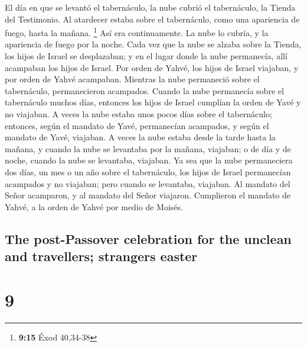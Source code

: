 \begin{paracol}{2}
 El día en que se levantó el tabernáculo, la nube cubrió
el tabernáculo, la Tienda del Testimonio. Al atardecer estaba sobre el
tabernáculo, como una apariencia de fuego, hasta la mañana. \footnote{\textbf{9:15}
  Éxod 40,34-38}  Así era continuamente. La nube lo
cubría, y la apariencia de fuego por la noche.  Cada vez
que la nube se alzaba sobre la Tienda, los hijos de Israel se
desplazaban; y en el lugar donde la nube permanecía, allí acampaban los
hijos de Israel.  Por orden de Yahvé, los hijos de Israel
viajaban, y por orden de Yahvé acampaban. Mientras la nube permaneció
sobre el tabernáculo, permanecieron acampados.  Cuando la
nube permanecía sobre el tabernáculo muchos días, entonces los hijos de
Israel cumplían la orden de Yavé y no viajaban.  A veces
la nube estaba unos pocos días sobre el tabernáculo; entonces, según el
mandato de Yavé, permanecían acampados, y según el mandato de Yavé,
viajaban.  A veces la nube estaba desde la tarde hasta la
mañana, y cuando la nube se levantaba por la mañana, viajaban; o de día
y de noche, cuando la nube se levantaba, viajaban.  Ya
sea que la nube permaneciera dos días, un mes o un año sobre el
tabernáculo, los hijos de Israel permanecían acampados y no viajaban;
pero cuando se levantaba, viajaban.  Al mandato del Señor
acamparon, y al mandato del Señor viajaron. Cumplieron el mandato de
Yahvé, a la orden de Yahvé por medio de Moisés.

\switchcolumn
\begin{otherlanguage}{english}

\hypertarget{the-post-passover-celebration-for-the-unclean-and-travellers-strangers-easter}{%
\subsection{The post-Passover celebration for the unclean and
travellers; strangers
easter}\label{the-post-passover-celebration-for-the-unclean-and-travellers-strangers-easter}}

\hypertarget{section-17}{%
\section{9}\label{section-17}}


\end{otherlanguage}
\end{paracol}
